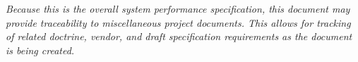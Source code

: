 











{\em 
Because this is the overall system performance specification, this document may provide traceability to miscellaneous project documents.
This allows for tracking of related doctrine, vendor, and draft specification requirements as the document is being created.
}



